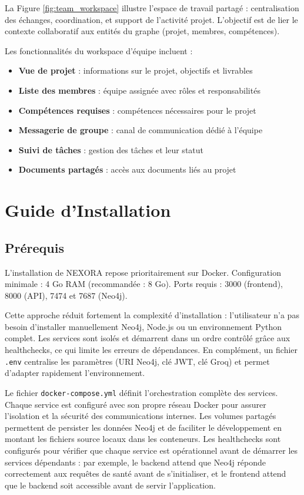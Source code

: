 \documentclass[12pt,a4paper]{report}
\begin{document}
La Figure \ref{fig:team_workspace} illustre l'espace de travail partagé : centralisation des échanges, coordination, et support de l'activité projet. L'objectif est de lier le contexte collaboratif aux entités du graphe (projet, membres, compétences).

Les fonctionnalités du workspace d'équipe incluent :
\begin{itemize}
  \item \textbf{Vue de projet} : informations sur le projet, objectifs et livrables
  \item \textbf{Liste des membres} : équipe assignée avec rôles et responsabilités
  \item \textbf{Compétences requises} : compétences nécessaires pour le projet
  \item \textbf{Messagerie de groupe} : canal de communication dédié à l'équipe
  \item \textbf{Suivi de tâches} : gestion des tâches et leur statut
  \item \textbf{Documents partagés} : accès aux documents liés au projet
\end{itemize}

\newpage
\chapter{Guide d'Installation}

\section{Prérequis}
L'installation de NEXORA repose prioritairement sur Docker. Configuration minimale : 4 Go RAM (recommandée : 8 Go). Ports requis : 3000 (frontend), 8000 (API), 7474 et 7687 (Neo4j).

Cette approche réduit fortement la complexité d'installation : l'utilisateur n'a pas besoin d'installer manuellement Neo4j, Node.js ou un environnement Python complet. Les services sont isolés et démarrent dans un ordre contrôlé grâce aux healthchecks, ce qui limite les erreurs de dépendances. En complément, un fichier \texttt{.env} centralise les paramètres (URI Neo4j, clé JWT, clé Groq) et permet d'adapter rapidement l'environnement.

Le fichier \texttt{docker-compose.yml} définit l'orchestration complète des services. Chaque service est configuré avec son propre réseau Docker pour assurer l'isolation et la sécurité des communications internes. Les volumes partagés permettent de persister les données Neo4j et de faciliter le développement en montant les fichiers source locaux dans les conteneurs. Les healthchecks sont configurés pour vérifier que chaque service est opérationnel avant de démarrer les services dépendants : par exemple, le backend attend que Neo4j réponde correctement aux requêtes de santé avant de s'initialiser, et le frontend attend que le backend soit accessible avant de servir l'application.
\end{document}
